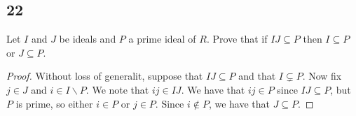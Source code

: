 \documentclass{article}
\newenvironment{hwproof}[1]
{
    #1
    \begin{proof}
}{
    \end{proof}
}
\begin{document}
\subsection*{22}
\begin{hwproof}
    {
        Let $I$ and $J$ be ideals and $P$ a prime ideal of $R$. Prove that if
        $IJ \subseteq P$ then $I \subseteq P$ or $J \subseteq P$.
    }
    Without loss of generalit, suppose that $IJ \subseteq P$ and that
    $I \subsetneq P$. Now fix $j \in J$
    and $i \in I \backslash P$. We note that $ij \in IJ$. We have that $ij \in P$ since
    $IJ \subseteq P$, but $P$ is prime, so either $i \in P$ or $j \in P$.
    Since $i \notin P$, we have that $J \subseteq P$.
\end{hwproof}
\end{document}
